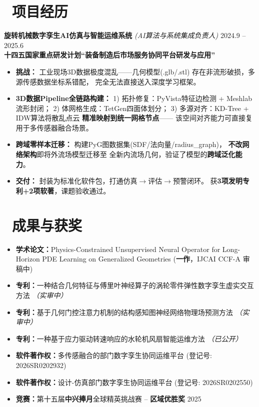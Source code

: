 \documentclass[11pt]{article}
\begin{document}
\section{\makebox[\widthof{\faBriefcase}][c]{\color{CVBlue}%
\faBriefcase}\ 项目经历}

\textbf{旋转机械数字孪生AI仿真与智能运维系统} 
\textit{(AI算法与系统集成负责人)} 
\hfill 2024.9 -- 2025.6\\[0.2em]
\textcolor{CVBlue}{\textbf{十四五国家重点研发计划``装备制造后市场服务协同平台研发与应用''}}
\begin{itemize}
    \item \textbf{挑战：}
      工业现场3D数据极度混乱——几何模型(.glb/.stl)
      存在非流形破损，多源传感数据坐标系错配，
      完全无法直接送入深度学习框架。
    \item \textbf{3D数据Pipeline全链路构建：}
      1) 拓扑修复：PyVista特征边检测 + Meshlab流形封闭；
      2) 体网格生成：TetGen四面体划分；
      3) 多源对齐：KD-Tree + IDW算法将散乱点云
      \textbf{精准映射到统一网格节点}——
      该空间对齐能力可直接复用于多传感器融合场景。
    \item \textbf{跨域零样本迁移：}
      构建PyG图数据集(SDF/法向量/radius\_graph)，
      \textbf{不改网络架构}即将外流场模型迁移至
      全新内流场几何，验证了模型的\textbf{跨域泛化能力}。
    \item \textbf{交付：}
      封装为标准化软件包，打通仿真$\to$评估$\to$预警闭环。
      获\textbf{3项发明专利+2项软著}，课题验收通过。
\end{itemize}



\section{%
    \makebox[\widthof{\faTrophy}][c]%
    {\color{CVBlue}\faTrophy}\ 成果与获奖%
}

\begin{itemize}
    \item \textbf{学术论文：}Physics-Constrained Unsupervised Neural Operator for Long-Horizon PDE Learning on Generalized Geometries (\textbf{一作}，IJCAI CCF-A 审稿中)
    \item \textbf{专利：}一种结合几何特征与傅里叶神经算子的涡轮零件弹性数字孪生虚实交互方法 \textit{（实审中）}
    \item \textbf{专利：}基于几何门控注意力机制的结构感知图神经网络物理场预测方法 \textit{（实审中）}
    \item \textbf{专利：}一种基于应力驱动转速响应的水轮机风扇智能运维方法 \textit{（已公开）}
    \item \textbf{软件著作权：}多传感融合的部门数字孪生协同运维平台 (登记号: 2026SR0202932)
    \item \textbf{软件著作权：}设计-仿真部门数字孪生协同运维平台 (登记号: 2026SR0202550)
    \item \textbf{竞赛：}第十五届\textbf{中兴捧月}全球精英挑战赛 -- \textbf{区域优胜奖} \hfill 2025
\end{itemize}
\end{document}
